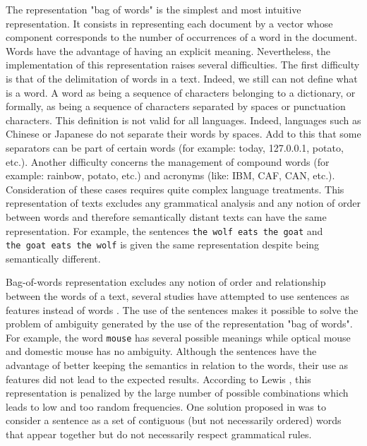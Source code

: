 The representation "bag of words" is the simplest and most intuitive
representation. It consists in representing each document by a vector
whose component corresponds to the number of occurrences of a word in
the document.  Words have the advantage of having an
explicit meaning. Nevertheless, the implementation of this
representation raises several difficulties. The first difficulty is that
of the delimitation of words in a text. Indeed, we still can not define
what is a word. A word as being a sequence of
characters belonging to a dictionary, or formally, as being a sequence
of characters separated by spaces or punctuation characters. This
definition is not valid for all languages. Indeed, languages such as
Chinese or Japanese do not separate their words by spaces. Add to this
that some separators can be part of certain words (for example: today,
127.0.0.1, potato, etc.). Another difficulty concerns the management of
compound words (for example: rainbow, potato, etc.) and acronyms (like:
IBM, CAF, CAN, etc.). Consideration of these cases requires quite
complex language treatments. This representation of texts excludes any
grammatical analysis and any notion of order between words and therefore
semantically distant texts can have the same representation. For
example, the sentences \texttt{the\ wolf\ eats\ the\ goat} and
\texttt{the\ goat\ eats\ the\ wolf} is given the same representation
despite being semantically different.


Bag-of-words representation excludes any notion of order and
relationship between the words of a text, several studies have
attempted to use sentences as features instead of words \cite{fuhr1991probabilistic} \cite{tzeras1993automatic}.
The use of the sentences makes it possible to solve the problem of
ambiguity generated by the use of the representation "bag of words". For
example, the word \texttt{mouse} has several possible meanings while
optical mouse and domestic mouse has no ambiguity. Although the
sentences have the advantage of better keeping the semantics in relation
to the words, their use as features did not lead to the expected
results. According to Lewis \citep{lewis1992representation}, this representation is penalized
by the large number of possible combinations which leads to low and too
random frequencies. One solution proposed in \citep{caropreso2001learner} was to consider a
sentence as a set of contiguous (but not necessarily ordered) words that
appear together but do not necessarily respect grammatical rules.

